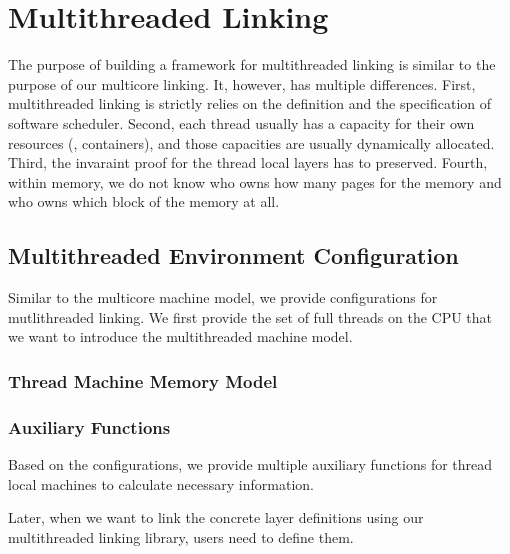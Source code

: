 \section{Multithreaded Linking}
\label{chapter:linking:sec:multithreaded-linking}

The purpose of building a framework for multithreaded linking is similar to 
the purpose of our multicore linking. 
It, however, has multiple differences. 
First, multithreaded linking is 
strictly relies on the definition and the specification of software scheduler.
Second, each thread usually has a capacity for their own resources (\eg, containers),
and those capacities are usually dynamically allocated. 
Third, the invaraint proof for the thread local layers has to preserved. 
Fourth, within memory, we do not know who owns how many pages for the memory 
and who owns which block of the memory at all. 



\subsection{Multithreaded Environment Configuration}
\label{chapter:linking:subsec:multithreaded-env-configuration}

Similar to the multicore machine model, we provide configurations 
for mutlithreaded linking. 
We first provide the set of full threads on the CPU that we want to introduce the multithreaded machine model. 

\subsubsection{Thread Machine Memory Model}


\subsubsection{Auxiliary Functions}

Based on the configurations, we provide multiple auxiliary functions 
for thread local machines to calculate necessary information. 

Later, when we want to link the concrete layer definitions using our multithreaded linking library, users need to define them.


